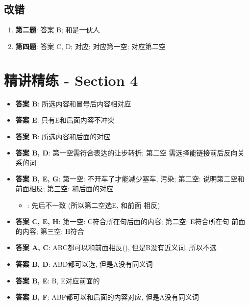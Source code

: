   \subsection{改错}

    \begin{enumerate}
      \item \textbf{第二题}: 答案 B; 和是一伙人
      \item \textbf{第四题}: 答案 C, D; 对应;
      对应第一空; 对应第二空
    \end{enumerate}

\section{精讲精练 - Section 4}

  \begin{itemize}
    \item \textbf{答案 B}: 所选内容和冒号后内容相对应
    \item \textbf{答案 E}: 只有E和后面内容不冲突
    \item \textbf{答案 B}: 所选内容和后面的对应
    \item \textbf{答案 B, D}: 第一空需符合表达的让步转折; 第二空
    需选择能链接前后反向关系的词
    \item \textbf{答案 B, E, G}: 第一空: 不开车了才能减少塞车, 污染; 第二空:
    说明第二空和前面相反; 第三空: 和后面的对应
    \begin{itemize}
      \item {}: 先后不一致 (所以第二空选E, 和前面
      相反)
    \end{itemize}

    \item \textbf{答案 C, E, H}: 第一空: C符合所在句后面的内容; 第二空: E符合所在句
    前面的内容; 第三空: H符合
    \item \textbf{答案 A, C}: ABC都可以和前面相反(), 但是B没有近义词,
    所以不选
    \item \textbf{答案 B, D}: ABD都可以选, 但是A没有同义词
    \item \textbf{答案 B, E}: B, E对应前面的
    \item \textbf{答案 B, F}: ABF都可以和后面的内容对应, 但是A没有同义词
  \end{itemize}

